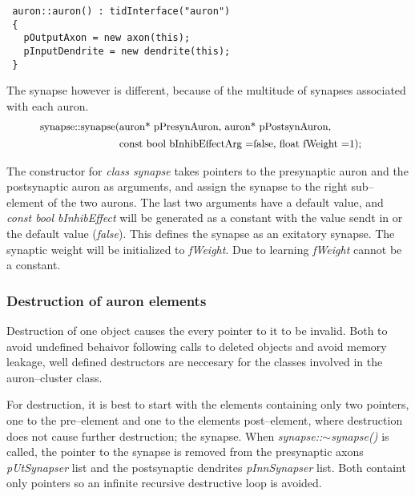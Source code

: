 
\begin{lstlisting}
 auron::auron() : tidInterface("auron")
 {
   pOutputAxon = new axon(this);         
   pInputDendrite = new dendrite(this);
 }
\end{lstlisting}

	The synapse however is different, because of the multitude of synapses associated with each auron. 
	\begin{equation} \nonumber
		\begin{split}
			\text{\small{synapse::synapse(}} &\text{\small{auron* pPresynAuron, auron* pPostsynAuron,}} \qquad \qquad\\
													&\text{\small{const bool bInhibEffectArg =false, float fWeight =1);}}
		\end{split} %
	\end{equation} %
			
	The constructor for \emph{class synapse} takes pointers to the presynaptic auron and the postsynaptic auron as arguments, and assign the synapse to the right sub--element of the two aurons. 
	The last two arguments have a default value, and \emph{const bool bInhibEffect} will be generated as a constant with the value sendt in or the default value (\emph{false}). This defines the synapse as an exitatory synapse. 
	The synaptic weight will be initialized to \emph{fWeight}. Due to learning \emph{fWeight} cannot be a constant.



	\subsubsection{Destruction of auron elements}
	Destruction of one object causes the every pointer to it to be invalid. 
	Both to avoid undefined behaivor following calls to deleted objects and avoid memory leakage, well defined destructors are neccesary for the classes involved in the auron--cluster class.

	For destruction, it is best to start with the elements containing only two pointers, one to the pre--element and one to the elements post--element, where destruction does not cause further destruction; the synapse.
	When \emph{synapse::$\sim$synapse()} is called, the pointer to the synapse is removed from the presynaptic axons \emph{pUtSynapser} list and the postsynaptic dendrites \emph{pInnSynapser} list. 
	Both containt only pointers so an infinite recursive destructive loop is avoided. %

